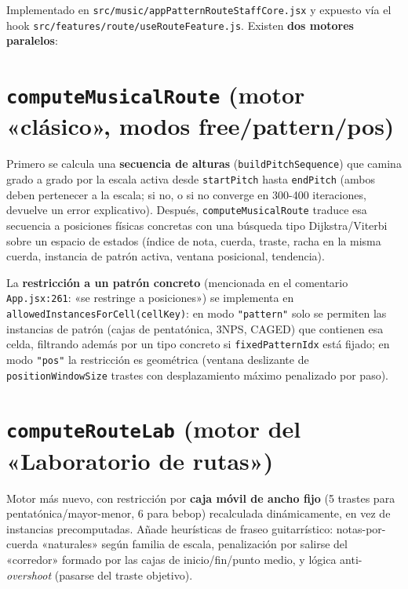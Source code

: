 \documentclass[a4paper,11pt,oneside]{report}
\begin{document}
Implementado en \lstinline!src/music/appPatternRouteStaffCore.jsx! y expuesto vía el hook \lstinline!src/features/route/useRouteFeature.js!. Existen \textbf{dos motores paralelos}:

\section{\texttt{computeMusicalRoute} (motor «clásico», modos free/pattern/pos)}
\label{sec:10.1}

Primero se calcula una \textbf{secuencia de alturas} (\lstinline!buildPitchSequence!) que camina grado a grado por la escala activa desde \lstinline!startPitch! hasta \lstinline!endPitch! (ambos deben pertenecer a la escala; si no, o si no converge en 300-400 iteraciones, devuelve un error explicativo). Después, \lstinline!computeMusicalRoute! traduce esa secuencia a posiciones físicas concretas con una búsqueda tipo Dijkstra/Viterbi sobre un espacio de estados (índice de nota, cuerda, traste, racha en la misma cuerda, instancia de patrón activa, ventana posicional, tendencia).

La \textbf{restricción a un patrón concreto} (mencionada en el comentario \lstinline!App.jsx:261!: «se restringe a posiciones») se implementa en \lstinline!allowedInstancesForCell(cellKey)!: en modo \lstinline!"pattern"! solo se permiten las instancias de patrón (cajas de pentatónica, 3NPS, CAGED) que contienen esa celda, filtrando además por un tipo concreto si \lstinline!fixedPatternIdx! está fijado; en modo \lstinline!"pos"! la restricción es geométrica (ventana deslizante de \lstinline!positionWindowSize! trastes con desplazamiento máximo penalizado por paso).

\section{\texttt{computeRouteLab} (motor del «Laboratorio de rutas»)}
\label{sec:10.2}

Motor más nuevo, con restricción por \textbf{caja móvil de ancho fijo} (5 trastes para pentatónica/mayor-menor, 6 para bebop) recalculada dinámicamente, en vez de instancias precomputadas. Añade heurísticas de fraseo guitarrístico: notas-por-cuerda «naturales» según familia de escala, penalización por salirse del «corredor» formado por las cajas de inicio/fin/punto medio, y lógica anti-\textit{overshoot} (pasarse del traste objetivo).
\end{document}
